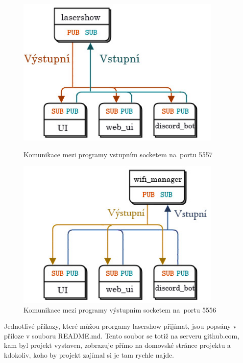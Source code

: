 \begin{figure}[htb]
  \centering
  \begin{minipage}{0.45\textwidth}
    \centering
    \includegraphics[width=0.9\textwidth]{img/comms_lasershow_scheme.jpg}
    \caption{\label{fig:lasershow_comms} Komunikace mezi programy vstupním socketem na~portu 5557}
  \end{minipage}\hfill
  \begin{minipage}{0.45\textwidth}
    \centering
    \includegraphics[width=0.9\textwidth]{img/comms_wifiman_scheme.jpg}
    \caption{\label{fig:wifiman_comms} Komunikace mezi programy výstupním socketem na~portu 5556}
  \end{minipage}
\end{figure}

Jednotlivé příkazy, které můžou prorgamy lasershow přijímat, jsou popsány v příloze v souboru README.md. Tento soubor se totiž na serveru github.com, kam byl projekt vystaven, zobrazuje přímo na domovské stránce projektu a kdokoliv, koho by projekt zajímal si je tam rychle najde.

